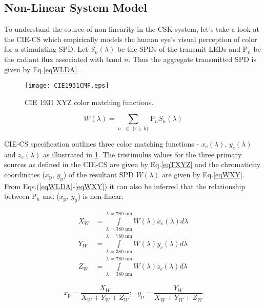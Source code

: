 \subsection{Non-Linear System Model}
\label{subsec:cskNonlinear}
To understand the source of non-linearity in the CSK system, let's take a look at the CIE-CS which empirically models the human eye's visual perception of color for a stimulating SPD. Let $S_{n}(\lambda)$ be the SPDs of the transmit LEDs and P$_{n}$ be the radiant flux associated with band $n$. Thus the aggregate transmitted SPD is given by Eq.\eqref{eqWLDA}.

\begin{figure}[!b]
	\centering
		\texttt{[image: CIE1931CMF.eps]}
	\caption{CIE 1931 XYZ color matching functions.}
	\label{figCIEXYZ}
\end{figure}

\begin{equation}
	W(\lambda) = \sum\limits_{n\text{ }\in\text{ \{i, j, k\}}}\text{P}_{n}S_{n}(\lambda)
	\label{eqWLDA}
\end{equation}

CIE-CS specification outlines three color matching functions - $x_{c}(\lambda)$, $y_{c}(\lambda)$ and $z_{c}(\lambda)$ as illustrated in \figurename{ }\ref{figCIEXYZ}. The tristimulus values for the three primary sources as defined in the CIE-CS are given by Eq.\eqref{eqTXYZ} and the chromaticity coordinates ($x_{\text{p}}$, $y_{\text{p}}$) of the resultant SPD $W(\lambda)$ are given by Eq.\eqref{eqWXY}. From Eqs.(\ref{eqWLDA}-\ref{eqWXY}) it can also be inferred that the relationship between P$_{n}$ and ($x_{\text{p}}$, $y_{\text{p}}$) is non-linear.

\begin{equation}
	\begin{aligned}
		X_{W} &= \int\limits_{\lambda\text{ = 380 nm}}^{\lambda\text{ = 780 nm}}W(\lambda)x_{c}(\lambda)d\lambda\\
		Y_{W} &= \int\limits_{\lambda\text{ = 380 nm}}^{\lambda\text{ = 780 nm}}W(\lambda)y_{c}(\lambda)d\lambda\\
		Z_{W} &= \int\limits_{\lambda\text{ = 380 nm}}^{\lambda\text{ = 780 nm}}W(\lambda)z_{c}(\lambda)d\lambda
	\end{aligned}
	\label{eqTXYZ}
\end{equation}

\begin{equation}
	x_{\text{p}} = \frac{X_{W}}{X_{W}+Y_{W}+Z_{W}}; \text{  } y_{\text{p}} = \frac{Y_{W}}{X_{W}+Y_{W}+Z_{W}} %
	\label{eqWXY}
\end{equation}

